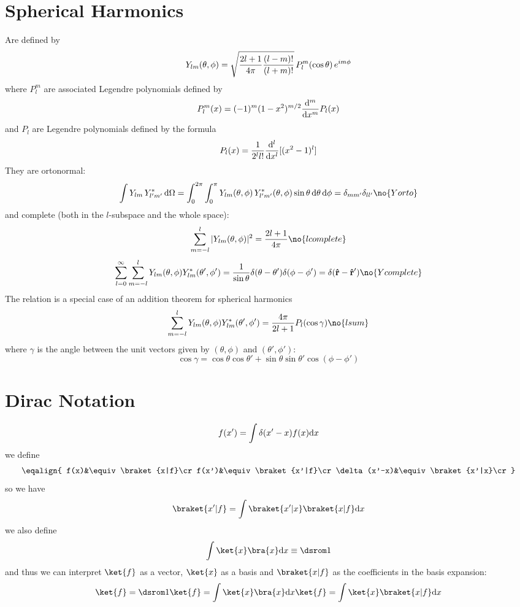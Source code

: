 \section{Spherical Harmonics}

Are defined by
$$Y_{lm}(\theta,\phi)=\sqrt{{2l+1\over4\pi}{(l-m)!\over(l+m)!}}\,P_l^m(\cos\theta)\,e^{im\phi}$$
where $P_l^m$ are associated Legendre polynomials defined by
$$P_l^m(x)=(-1)^m (1-x^2)^{m/2}{{\rm d}^m\over{\rm d} x^m} P_l(x)$$
and $P_l$ are Legendre polynomials defined by the formula
$$P_l(x)={1\over2^l l!}{{\rm d}^l\over{\rm d} x^l}[(x^2-1)^l]$$
They are ortonormal:
$$\int Y_{lm}\,Y^*_{l'm'}\,\d\Omega = 
\int_0^{2\pi}\int_0^{\pi}
Y_{lm}(\theta,\phi)\,Y^*_{l'm'}(\theta,\phi)\sin\theta\,\d\theta\,\d\phi = 
\delta_{mm'}\delta_{ll'}\no{Yorto}$$
and complete (both in the $l$-subspace and the whole space):
$$\sum_{m=-l}^l|Y_{lm}(\theta,\phi)|^2={2l+1\over4\pi}\no{lcomplete}$$
$$\sum_{l=0}^\infty\sum_{m=-l}^lY_{lm}(\theta,\phi)Y_{lm}^*(\theta',\phi')
={1\over\sin\theta}\delta(\theta-\theta')\delta(\phi-\phi')=
\delta({\bf\hat r}-{\bf\hat r'})\no{Ycomplete}$$
The relation  is a special case of an addition theorem for
spherical harmonics
$$\sum_{m=-l}^lY_{lm}(\theta,\phi)Y_{lm}^*(\theta',\phi')=
{4\pi\over 2l+1}P_l(\cos\gamma) \no{lsum}
$$
where $\gamma$ is the angle between the unit vectors given by $(\theta,\phi)$
and $(\theta',\phi')$:
$$\cos\gamma=\cos\theta\cos\theta'+\sin\theta\sin\theta'\cos(\phi-\phi')$$

\section{Dirac Notation}

$$f(x')=\int\delta(x'-x)f(x){\rm d} x$$
we define
$$\eqalign{
f(x)&\equiv\braket{x|f}\cr
f(x')&\equiv\braket{x'|f}\cr
\delta(x'-x)&\equiv\braket{x'|x}\cr
}$$
so we have
$$\braket{x'|f}=\int\braket{x'|x}\braket{x|f}\d x$$
we also define
$$\int\ket{x}\bra{x}\d x\equiv\one$$
and thus we can interpret $\ket{f}$ as a vector, $\ket{x}$ as a basis and
$\braket{x|f}$ as the coefficients in the basis expansion:
$$\ket{f}=\one\ket{f}=\int\ket{x}\bra{x}\d x\ket{f}=
\int\ket{x}\braket{x|f}\d x$$

